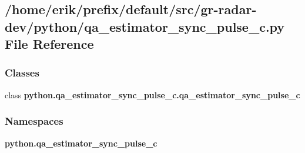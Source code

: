 \subsection{/home/erik/prefix/default/src/gr-\/radar-\/dev/python/qa\+\_\+estimator\+\_\+sync\+\_\+pulse\+\_\+c.py File Reference}
\label{qa__estimator__sync__pulse__c_8py}
\subsubsection*{Classes}
\begin{DoxyCompactItemize}
\item 
class {\bf python.\+qa\+\_\+estimator\+\_\+sync\+\_\+pulse\+\_\+c.\+qa\+\_\+estimator\+\_\+sync\+\_\+pulse\+\_\+c}
\end{DoxyCompactItemize}
\subsubsection*{Namespaces}
\begin{DoxyCompactItemize}
\item 
 {\bf python.\+qa\+\_\+estimator\+\_\+sync\+\_\+pulse\+\_\+c}
\end{DoxyCompactItemize}
